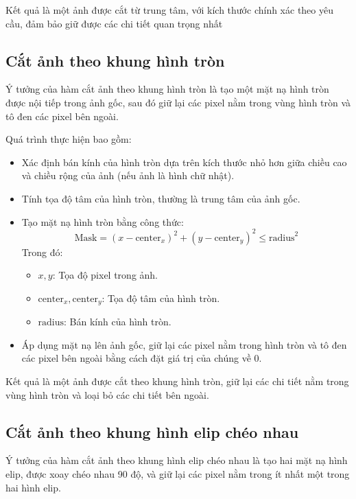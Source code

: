 Kết quả là một ảnh được cắt từ trung tâm, với kích thước chính xác theo yêu cầu, đảm bảo giữ được các chi tiết quan trọng nhất

\subsection{Cắt ảnh theo khung hình tròn}
Ý tưởng của hàm cắt ảnh theo khung hình tròn là tạo một mặt nạ hình tròn được nội tiếp trong ảnh gốc, sau đó giữ lại các pixel nằm trong vùng hình tròn và tô đen các pixel bên ngoài.

Quá trình thực hiện bao gồm:
\begin{itemize}
	\item Xác định bán kính của hình tròn dựa trên kích thước nhỏ hơn giữa chiều cao và chiều rộng của ảnh (nếu ảnh là hình chữ nhật).
	\item Tính tọa độ tâm của hình tròn, thường là trung tâm của ảnh gốc.
	\item Tạo mặt nạ hình tròn bằng công thức:
	      \[
		      \text{Mask} = (x - \text{center}_x)^2 + (y - \text{center}_y)^2 \leq \text{radius}^2
	      \]
	      Trong đó:
	      \begin{itemize}
		      \item \(x, y\): Tọa độ pixel trong ảnh.
		      \item \(\text{center}_x, \text{center}_y\): Tọa độ tâm của hình tròn.
		      \item \(\text{radius}\): Bán kính của hình tròn.
	      \end{itemize}
	\item Áp dụng mặt nạ lên ảnh gốc, giữ lại các pixel nằm trong hình tròn và tô đen các pixel bên ngoài bằng cách đặt giá trị của chúng về 0.
\end{itemize}

Kết quả là một ảnh được cắt theo khung hình tròn, giữ lại các chi tiết nằm trong vùng hình tròn và loại bỏ các chi tiết bên ngoài.

\subsection{Cắt ảnh theo khung hình elip chéo nhau}
Ý tưởng của hàm cắt ảnh theo khung hình elip chéo nhau là tạo hai mặt nạ hình elip, được xoay chéo nhau 90 độ, và giữ lại các pixel nằm trong ít nhất một trong hai hình elip.

